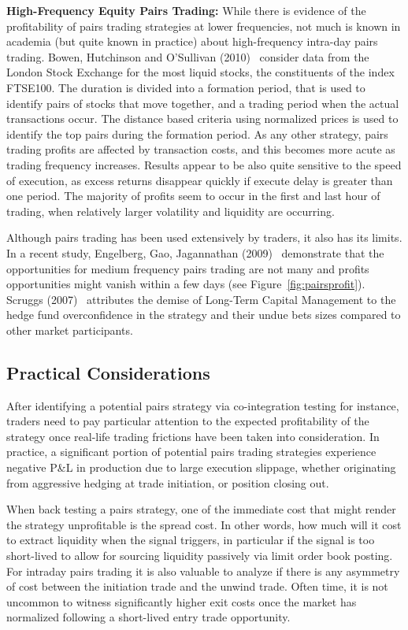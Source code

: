 \noindent\textbf{High-Frequency Equity Pairs Trading:} While there is evidence of the profitability of pairs trading strategies at lower frequencies, not much is known in academia (but quite known in practice) about high-frequency intra-day pairs trading. Bowen, Hutchinson and O'Sullivan (2010)~\cite{bho} consider data from the London Stock Exchange for the most liquid stocks, the constituents of the index FTSE100. The duration is divided into a formation period, that is used to identify pairs of stocks that move together, and a trading period when the actual transactions occur. The distance based criteria using normalized prices is used to identify the top pairs during the formation period. As any other strategy, pairs trading profits are affected by transaction costs, and this becomes more acute as trading frequency increases. Results appear to be also quite sensitive to the speed of execution, as excess returns disappear quickly if execute delay is greater than one period. The majority of profits seem to occur in the first and last hour of trading, when relatively larger volatility and liquidity are occurring.


Although pairs trading has been used extensively by traders, it also has its limits. In a recent study, Engelberg, Gao, Jagannathan (2009)~\cite{engelberg2009anatomy} demonstrate that the opportunities for medium frequency pairs trading are not many and profits opportunities might vanish within a few days (see Figure~\ref{fig:pairsprofit}). Scruggs (2007)~\cite{scruggs} attributes the demise of Long-Term Capital Management to the hedge fund overconfidence in the strategy and their undue bets sizes compared to other market participants.


\subsection{Practical Considerations}


After identifying a potential pairs strategy via co-integration testing for instance, traders need to pay particular attention to the expected profitability of the strategy once real-life trading frictions have been taken into consideration. In practice, a significant portion of potential pairs trading strategies experience negative P\&L in production due to large execution slippage, whether originating from aggressive hedging at trade initiation, or position closing out.


When back testing a pairs strategy, one of the immediate cost that might render the strategy unprofitable is the spread cost. In other words, how much will it cost to extract liquidity when the signal triggers, in particular if the signal is too short-lived to allow for sourcing liquidity passively via limit order book posting. For intraday pairs trading it is also valuable to analyze if there is any asymmetry of cost between the initiation trade and the unwind trade. Often time, it is not uncommon to witness significantly higher exit costs once the market has normalized following a short-lived entry trade opportunity. 


